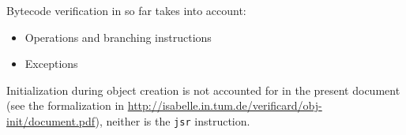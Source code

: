 Bytecode verification in \mJava{} so far takes into account:
\begin{itemize}
\item Operations and branching instructions
\item Exceptions
\end{itemize}
Initialization during object creation is not accounted for in the
present document 
(see the formalization in
\url{http://isabelle.in.tum.de/verificard/obj-init/document.pdf}),
neither is the \texttt{jsr} instruction.


